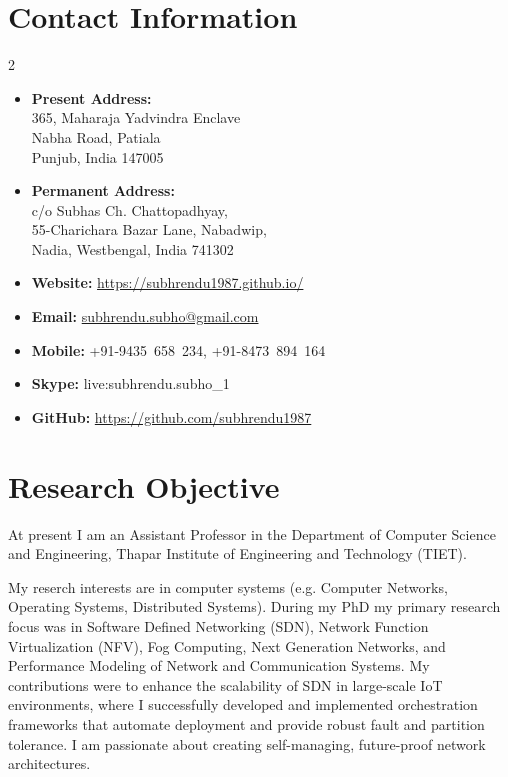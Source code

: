 \documentclass{article}
\begin{document}
 
\begin{center}
	\Large{\bf \name}
\end{center}
 \noindent\makebox[\linewidth]{\rule{\textwidth}{0.4pt}}
\section{Contact Information}
\setlength{\columnsep}{-2.5cm}

\begin{multicols}{2}
	\begin{itemize}
		 \item{\bf Present Address:}\\
		 365, Maharaja Yadvindra Enclave\\
		 Nabha Road, Patiala\\
		 Punjub, India 147005
		\item{\bf Permanent Address:}\\
		 c/o Subhas Ch. Chattopadhyay,\\
		 55-Charichara Bazar Lane, Nabadwip,\\
		 Nadia, Westbengal, India 741302
	\columnbreak
		\item {\bf Website:} \url{https://subhrendu1987.github.io/}
		\item {\bf Email:} \url{subhrendu.subho@gmail.com}
		\item {\bf Mobile:} +91-9435~658~234, +91-8473~894~164
		\item {\bf Skype:} live:subhrendu.subho\_1
		\item {\bf GitHub:} \url{https://github.com/subhrendu1987}
	\end{itemize}
\end{multicols}
\section{Research Objective}
\par At present I am an Assistant Professor in the Department of Computer Science and Engineering, Thapar Institute of Engineering and Technology (TIET).

My reserch interests are in computer systems (e.g. Computer Networks, Operating Systems, Distributed Systems). During my PhD my primary research focus was in Software Defined Networking (SDN), Network Function Virtualization (NFV), Fog Computing, Next Generation Networks, and Performance Modeling of Network and Communication Systems. My contributions were to enhance the scalability of SDN in large-scale IoT environments, where I successfully developed and implemented orchestration frameworks that automate deployment and provide robust fault and partition tolerance. I am passionate about creating self-managing, future-proof network architectures.
\end{document}
